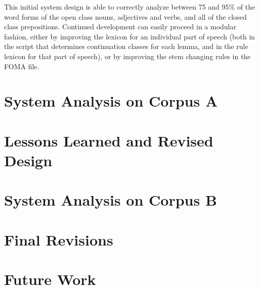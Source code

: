 \documentclass[11pt,letterpaper]{article}
\begin{document}
This initial system design is able to correctly analyze between 75 and 95\% of
the word forms of the open class nouns, adjectives and verbs, and all of the
closed class prepositions.  Continued development can easily proceed in a
modular fashion, either by improving the lexicon for an individual part of
speech (both in the script that determines continuation classes for each lemma,
and in the rule lexicon for that part of speech), or by improving the stem
changing rules in the FOMA file.

\section{System Analysis on Corpus A}

\section{Lessons Learned and Revised Design}

\section{System Analysis on Corpus B}

\section{Final Revisions}

\section{Future Work}







\label{lastpage}
\end{document}
